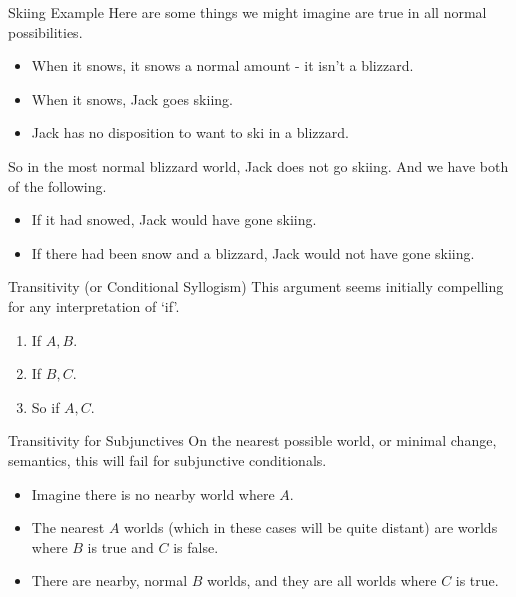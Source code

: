 \documentclass[
  ignorenonframetext,
]{beamer}
\providecommand{\tightlist}{%
  \setlength{\itemsep}{0pt}\setlength{\parskip}{0pt}}
\renewcommand{\,}{\text{, }}
\begin{document}
\begin{frame}{Skiing Example}
\protect\hypertarget{skiing-example}{}
Here are some things we might imagine are true in all normal
possibilities.

\begin{itemize}
\tightlist
\item
  When it snows, it snows a normal amount - it isn't a blizzard.
\item
  When it snows, Jack goes skiing.
\item
  Jack has no disposition to want to ski in a blizzard. \pause
\end{itemize}

So in the most normal blizzard world, Jack does not go skiing. And we
have both of the following.

\begin{itemize}
\tightlist
\item
  If it had snowed, Jack would have gone skiing.
\item
  If there had been snow and a blizzard, Jack would not have gone
  skiing.
\end{itemize}
\end{frame}

\begin{frame}{Transitivity (or Conditional Syllogism)}
\protect\hypertarget{transitivity-or-conditional-syllogism}{}
This argument seems initially compelling for any interpretation of `if'.

\begin{enumerate}
\tightlist
\item
  If \(A, B\).
\item
  If \(B, C\).
\item
  So if \(A, C\).
\end{enumerate}
\end{frame}

\begin{frame}{Transitivity for Subjunctives}
\protect\hypertarget{transitivity-for-subjunctives}{}
On the nearest possible world, or minimal change, semantics, this will
fail for subjunctive conditionals.

\begin{itemize}
\tightlist
\item
  Imagine there is no nearby world where \(A\).
\item
  The nearest \(A\) worlds (which in these cases will be quite distant)
  are worlds where \(B\) is true and \(C\) is false.
\item
  There are nearby, normal \(B\) worlds, and they are all worlds where
  \(C\) is true.
\end{itemize}
\end{frame}
\end{document}
